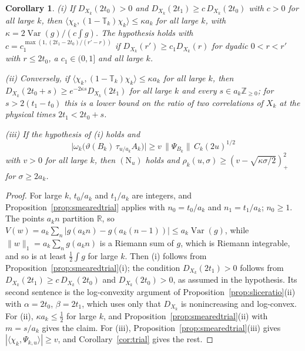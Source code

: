\documentclass[aps,prd,twocolumn,superscriptaddress,nofootinbib,longbibliography,floatfix,amsmath,amssymb,10pt]{revtex4-2}
\newtheorem{corollary}[theorem]{Corollary}
\theoremstyle{definition}
\theoremstyle{remark}
\newcommand{\R}{\mathbb{R}}
\newcommand{\Z}{\mathbb{Z}}
\newcommand{\Var}{\operatorname{Var}}
\newcommand{\ip}[2]{\langle #1,#2\rangle}
\begin{document}
\begin{corollary}\label{cor:smearedtrial}
\textup{(i)} If $D_{X_k}(2t_0)>0$ and $D_{X_k}(2t_1)\ge c\,D_{X_k}(2t_0)$ with $c>0$ for all large
$k$, then $\ip{\chi_k}{(1-\mathbb T_k)\chi_k}\le\kappa a_k$ for all large
$k$, with $\kappa=2\Var(g)/(c\int g)$. The hypothesis holds with
$c=c_1^{\max(1,(2t_1-2t_0)/(r'-r))}$ if $D_{X_k}(r')\ge c_1D_{X_k}(r)$ for
dyadic $0<r<r'$ with $r\le2t_0$, a $c_1\in(0,1]$ and all large $k$.

\textup{(ii)} Conversely, if $\ip{\chi_k}{(1-\mathbb T_k)\chi_k}\le\kappa
a_k$ for all large $k$, then $D_{X_k}(2t_0+s)\ge e^{-2\kappa s}D_{X_k}(2t_1)$
for all large $k$ and every $s\in a_k\Z_{\ge0}$; for $s>2(t_1-t_0)$ this is a
lower bound on the ratio of two correlations of $X_k$ at the physical times
$2t_1<2t_0+s$.

\textup{(iii)} If the hypothesis of \textup{(i)} holds and
\[
\bigl|\omega_k\bigl(\vartheta(B_k)\,\tau_{u/a_k}A_k\bigr)\bigr|\ge
v\,\|\Psi_{B_k}\|\,C_k(2u)^{1/2}
\]
with $v>0$ for all large $k$, then $(\mathrm N_u)$ holds and
$\rho_k(u,\sigma)\ge(v-\sqrt{\kappa\sigma/2})_+^2$ for $\sigma\ge2a_k$.
\end{corollary}

\begin{proof}
For large $k$, $t_0/a_k$ and $t_1/a_k$ are integers, and
Proposition~\ref{prop:smearedtrial} applies with $n_0=t_0/a_k$ and
$n_1=t_1/a_k$; $n_0\ge1$. The points $a_kn$ partition $\R$, so
$V(w)=a_k\sum_n|g(a_kn)-g(a_k(n-1))|\le a_k\Var(g)$, while
$\|w\|_1=a_k\sum_ng(a_kn)$ is a Riemann sum of $g$, which is Riemann
integrable, and so is at least $\frac12\int g$ for large $k$. Then (i)
follows from Proposition~\ref{prop:smearedtrial}(i); the condition
$D_{X_k}(2t_1)>0$ follows from $D_{X_k}(2t_1)\ge c\,D_{X_k}(2t_0)$ and $D_{X_k}(2t_0)>0$, as assumed in the
hypothesis. Its second sentence is the log-convexity argument of
Proposition~\ref{prop:sliceratio}(ii) with $\alpha=2t_0$, $\beta=2t_1$,
which uses only that $D_{X_k}$ is nonincreasing and log-convex. For (ii),
$\kappa a_k\le\frac12$ for large $k$, and Proposition~\ref{prop:smearedtrial}(ii)
with $m=s/a_k$ gives the claim. For (iii), Proposition~\ref{prop:smearedtrial}(iii)
gives $|\ip{\chi_k}{\Psi_{k,u}}|\ge v$, and Corollary~\ref{cor:trial} gives
the rest.
\end{proof}
\end{document}
